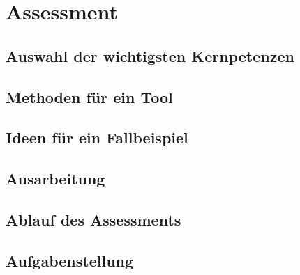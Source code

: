 \chapter{Assessment}

\section{Auswahl der wichtigsten Kernpetenzen}

\section{Methoden für ein Tool}

\section{Ideen für ein Fallbeispiel}

\section{Ausarbeitung}

\section{Ablauf des Assessments}

\section{Aufgabenstellung}